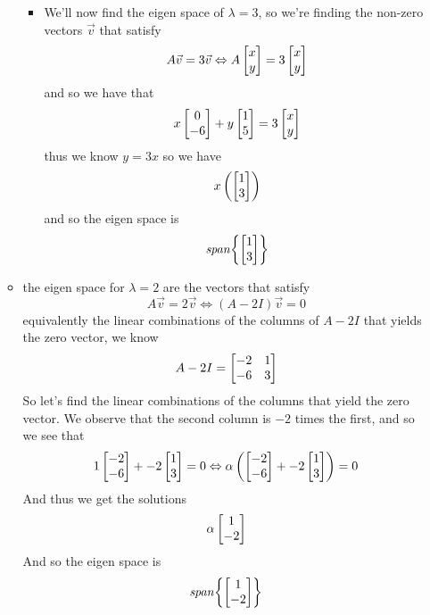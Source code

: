 \documentclass[11pt]{book}
\begin{document}
\begin{itemize}
\begin{itemize}
\begin{itemize}
                    \item We'll now find the eigen space of $\lambda = 3$, so we're finding the non-zero vectors $\vec{v} $ that satisfy 
                        \[
                        A\vec{v} = 3\vec{v} \Leftrightarrow A\begin{bmatrix} x \\ y \end{bmatrix} = 3\begin{bmatrix} x \\ y \end{bmatrix}   
                        \]
                    and so we have that 
                    \[
                        x\begin{bmatrix} 0 \\ -6 \end{bmatrix}  + y\begin{bmatrix} 1 \\ 5\end{bmatrix} = 3\begin{bmatrix} x \\ y \end{bmatrix} 
                    \]
                    thus we know $y= 3x$ so we have 
                    \[
                        x\left( \begin{bmatrix} 1 \\ 3 \end{bmatrix}  \right) 
                    \]
                    and so the eigen space is 
                    \[
                    \mathit{span} {\left\{ \begin{bmatrix} 1 \\ 3 \end{bmatrix}  \right\} } 
                    \]
                \end{itemize}
            \item the eigen space for $\lambda = 2$ are the vectors that satisfy 
                \[
                    A\vec{v} = 2\vec{v} \Leftrightarrow \left( A - 2I \right) \vec{v} = 0
                \]
                equivalently the linear combinations of the columns of $A - 2I$ that yields the zero vector, we know 
                \[
                A  - 2I= \begin{bmatrix} -2 & 1 \\ -6 & 3 \end{bmatrix}
                \]
                So let's find the linear combinations of the columns that yield the zero vector. We observe that the second column is $-2$ times the first, and so we see that
                \[
                    1\begin{bmatrix} -2 \\ -6 \end{bmatrix}  + -2\begin{bmatrix} 1 \\ 3 \end{bmatrix} = 0 \Leftrightarrow \alpha \left( \begin{bmatrix} -2 \\ -6 \end{bmatrix}  + -2\begin{bmatrix} 1 \\ 3 \end{bmatrix}  \right) = 0
                \]
                And thus we get the solutions
                \[
                    \alpha \begin{bmatrix} 1 \\ -2 \end{bmatrix} 
                \]
                And so the eigen space is
                \[
                \mathit{span} {\left\{ \begin{bmatrix} 1 \\ -2 \end{bmatrix}  \right\} } 
                \]
        \end{itemize}
\end{itemize}
\end{document}

